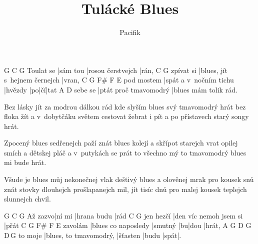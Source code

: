 \documentclass{song}
\title{Tulácké Blues}
\author{Pacifik}
\begin{document}
\strophe
          G        C\7               G
Toulat se |sám tou |rosou čerstvejch |rán,
          C\7                           G
zpívat si |blues, jít s~hejnem černejch |vran,
           C\7                    G       F\#\7 F\7 E\7
pod mostem |spát a v~nočním tichu |hvězdy |po|čí|tat
        A\7                   D\7
sebe se |ptát proč tmavomodrý |blues mám tolik rád.
\endstrophe

\strophe*
Bez lásky jít za modrou dálkou rád
kde slyším blues svý tmavomodrý hrát
bez floka žít a v~dobytčáku světem cestovat
žebrat i pít a po přístavech starý songy hrát. 
\endstrophe

\strophe*
Zpocený blues sedřenejch paží znát
blues kolejí a skřípot starejch vrat
opilej smích a dětskej pláč a v~putykách se prát
to všechno mý to tmavomodrý blues mi bude hrát.
\endstrophe

\strophe*
Všude je blues můj nekonečnej vlak
deštivý blues a olověnej mrak
pro kousek snů znát stovky dlouhejch prošlapanejch mil,
jít tisíc dnů pro malej kousek teplejch slunnejch chvil.
\endstrophe

\strophe
        G      C\7         G
Až zazvo|ní mi |hrana budu |rád
          C\7                    G
jen hezčí |den víc nemoh jsem si |přát
        C\7                 G       F\#\7 F\7 E\7
zavolám |blues co naposledy |smutný |bu|dou |hrát,
        A\7                    G        D\7   G    D\7\,G
to moje |blues, to tmavomodrý, |šťasten |budu |spát|.
\endstrophe
\end{document}
